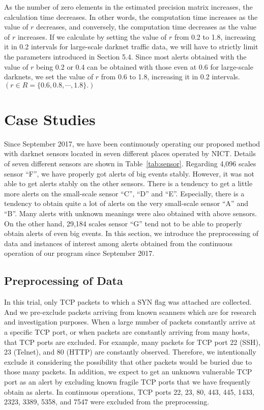 \documentclass[letterpaper]{sig-alternate-10pt}
\begin{document}
As the number of zero elements in the estimated precision matrix increases, the calculation time decreases.
In other words, the computation time increases as the value of $r$ decreases, and conversely, the computation time decreases as the value of $r$ increases.
If we calculate by setting the value of $r$ from 0.2 to 1.8, increasing it in 0.2 intervals for large-scale darknet traffic data, we will have to strictly limit the parameters introduced in Section 5.4.
Since most alerts obtained with the value of $r$ being 0.2 or 0.4 can be obtained with those even at 0.6 for large-scale darknets, we set the value of $r$ from 0.6 to 1.8, increasing it in 0.2 intervals. $(r \in R=\{0.6, 0.8, \cdots, 1.8\}.)$

\section{Case Studies}
Since September 2017, we have been continuously operating our proposed method with darknet sensors located in seven different places operated by NICT.
Details of seven different sensors are shown in Table~\ref{tab:sensor}.
Regarding 4,096 scales sensor ``F'', we have properly got alerts of big events stably.
However, it was not able to get alerts stably on the other sensors.
There is a tendency to get a little more alerts on the small-scale sensor ``C'', ``D'' and ``E''.
Especially, there is a tendency to obtain quite a lot of alerts on the very small-scale sensor ``A'' and ``B''.
Many alerts with unknown meanings were also obtained with above sensors.
On the other hand, 29,184 scales sensor ``G'' tend not to be able to properly obtain alerts of even big events.
In this section, we introduce the preprocessing of data and instances of interest among alerts obtained from the continuous operation of our program since September 2017.


\subsection{Preprocessing of Data}
In this trial, only TCP packets to which a SYN flag was attached are collected.
And we pre-exclude packets arriving from known scanners which are for research and investigation purposes.
When a large number of packets constantly arrive at a specific TCP port, or when packets are constantly arriving from many hosts, that TCP ports are excluded.
For example, many packets for TCP port 22 (SSH), 23 (Telnet), and 80 (HTTP) are constantly observed.
Therefore, we intentionally exclude it considering the possibility that other packets would be buried due to those many packets.
In addition, we expect to get an unknown vulnerable TCP port as an alert by excluding known fragile TCP ports that we have frequently obtain as alerts.
In continuous operations, TCP ports 22, 23, 80, 443, 445, 1433, 2323, 3389, 5358, and 7547 were excluded from the preprocessing.
\end{document}

